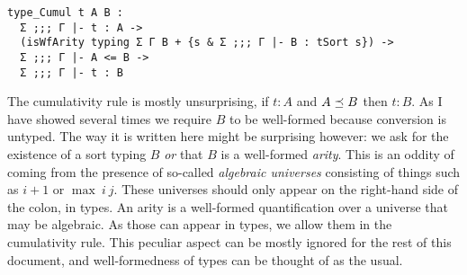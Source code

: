 \begin{verbatim}
type_Cumul t A B :
  Σ ;;; Γ |- t : A ->
  (isWfArity typing Σ Γ B + {s & Σ ;;; Γ |- B : tSort s}) ->
  Σ ;;; Γ |- A <= B ->
  Σ ;;; Γ |- t : B
\end{verbatim}
The cumulativity rule is mostly unsurprising, if \(t : A\) and \(A \preceq B\)
then \(t : B\). As I have showed several times we require \(B\) to be
well-formed because conversion is untyped.
The way it is written here might be surprising however: we ask for the existence
of a sort typing \(B\) \emph{or} that \(B\) is a well-formed \emph{arity}.
This is an oddity of \Coq coming from the presence of so-called
\emph{algebraic universes} consisting of things such as \(i+1\) or
\(\max\ i\ j\). These universes should only appear on the right-hand side of
the colon, \ie in types.
An arity is a well-formed quantification over a universe that may be
algebraic. As those can appear in types, we allow them in the cumulativity
rule.
This peculiar aspect can be mostly ignored for the rest of this document,
and well-formedness of types can be thought of as the usual.